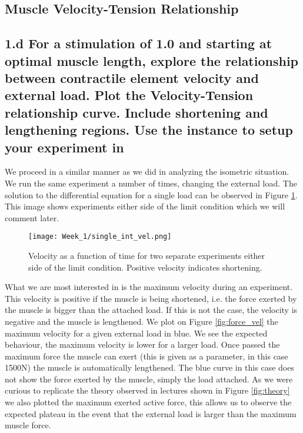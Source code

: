 \documentclass[11pt]{article}
\begin{document}
\newpage
\subsection*{Muscle Velocity-Tension Relationship}



\subsection*{1.d For a stimulation of 1.0 and starting at optimal
  muscle length, explore the relationship between contractile element
  velocity and external load. Plot the Velocity-Tension relationship
  curve. Include shortening and lengthening regions. Use the
   instance
  to setup your experiment in }

We proceed in a similar manner as we did in analyzing the isometric situation. We run the same experiment a number of times, changing the external load. The solution to the differential equation for a single load can be observed in Figure \ref{fig:single_vel}. This image shows experiments either side of the limit condition which we will comment later. 

\begin{figure}[!h]
\texttt{[image: Week\_1/single\_int\_vel.png]}
\centering
\caption{Velocity as a function of time for two separate experiments either side of the limit condition. Positive velocity indicates shortening.}
\label{fig:single_vel}
\end{figure}
\newpage 
What we are most interested in is the maximum velocity during an experiment. This velocity is positive if the muscle is being shortened, i.e. the force exerted by the muscle is bigger than the attached load. If this is not the case, the velocity is negative and the muscle is lengthened. We plot on Figure \ref{fig:force_vel} the maximum velocity for a given external load in blue. We see the expected behaviour, the maximum velocity is lower for a larger load. Once passed the maximum force the muscle can exert (this is given as a parameter, in this case 1500N) the muscle is automatically lengthened. The blue curve in this case does not show the force exerted by the muscle, simply the load attached. As we were curious to replicate the theory observed in lectures shown in Figure \ref{fig:theory} we also plotted the maximum exerted active force, this allows us to observe the expected plateau in the event that the external load is larger than the maximum muscle force. 
\end{document}
